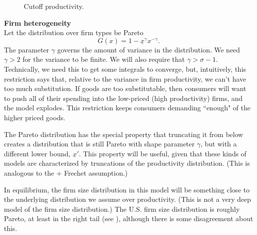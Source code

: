 \documentclass[11pt, pdftex]{article}
\begin{document}
\begin{figure}[ht]
\caption{Cutoff productivity.}
\label{fig:dfs}
\centering
{}
\end{figure}


\textbf{Firm heterogeneity}\\
Let the distribution over firm types be Pareto
\begin{equation}\label{eq:pareto}
    G(x) = 1-\underline{x}^{\gamma}x^{-\gamma}.
\end{equation}
The parameter $\gamma$ governs the amount of variance in the distribution.  We need $\gamma>2$ for the variance to be finite.  We will also require that $\gamma>\sigma-1$.  Technically, we need this to get some integrals to converge, but, intuitively, this restriction says that, relative to the variance in firm productivity, we can't have too much substitution.  If goods are too substitutable, then consumers will want to push all of their spending into the  low-priced (high productivity) firms, and the model explodes.  This restriction keeps consumers demanding ``enough" of the higher priced goods.

The Pareto distribution has the special property that truncating it from below creates a distribution that is still Pareto with shape parameter $\gamma$, but with a different lower bound, $\underline{x}'$.  This property will be useful, given that these kinds of models are characterized by truncations of the productivity distribution.  (This is analogous to the \citet{EK02} + Frechet assumption.)

In equilibrium, the firm size distribution in this model will be something close to the underlying distribution we assume over productivity. (This is not a very deep model of the firm size distribution.)  The U.S. firm size distribution is roughly Pareto, at least in the right tail (see \cite{axtel}), although there is some disagreement about this.
\end{document}
